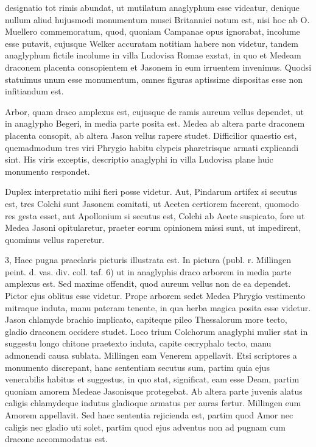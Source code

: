 \documentclass[a4paper, 11pt, oneside, polutonikogreek, german]{article}
\begin{document}
designatio tot rimis abundat, ut mutilatum anaglyphum esse videatur, denique nullum aliud hujusmodi monumentum musei Britannici notum est, nisi hoc ab O. Muellero commemoratum, quod, quoniam Campanae opus ignorabat, incolume esse putavit, cujusque Welker accuratam notitiam habere non videtur, tandem anaglyphum fictile incolume in villa Ludovisa Romae exstat, in quo et Medeam draconem placenta consopientem et Jasonem in eum irruentem invenimus. Quodsi statuimus unum esse monumentum, omnes figuras aptissime dispositas esse non infitiandum est.

Arbor, quam draco amplexus est, cujusque de ramis aureum vellus dependet, ut in anaglypho Begeri, in media parte posita est. Medea ab altera parte draconem placenta consopit, ab altera Jason vellus rapere studet. Difficilior quaestio est, quemadmodum tres viri Phrygio habitu clypeis pharetrisque armati explicandi sint. His viris exceptis, descriptio anaglyphi in villa Ludovisa plane huic monumento respondet.

Duplex interpretatio mihi fieri posse videtur. Aut, Pindarum artifex si secutus est, tres Colchi sunt Jasonem comitati, ut Aeeten certiorem facerent, quomodo res gesta esset, aut Apollonium si secutus est, Colchi ab Aeete suspicato, fore ut Medea Jasoni opitularetur, praeter eorum opinionem missi sunt, ut impedirent, quominus vellus raperetur.

3, Haec pugna praeclaris picturis illustrata est. In pictura (publ. r. Millingen peint. d. vas. div. coll. taf. 6) ut in anaglyphis draco arborem in media parte amplexus est. Sed maxime offendit, quod aureum vellus non de ea dependet. Pictor ejus oblitus esse videtur. Prope arborem sedet Medea Phrygio vestimento mitraque induta, manu pateram tenente, in qua herba magica posita esse videtur. Jason chlamyde brachio implicato, capiteque pileo Thessalorum more tecto, gladio draconem occidere studet. Loco trium Colchorum anaglyphi mulier stat in suggestu longo chitone praetexto induta, capite cecryphalo tecto, manu admonendi causa sublata. Millingen eam Venerem appellavit. Etsi scriptores a monumento discrepant, hanc sententiam secutus sum, partim quia ejus venerabilis habitus et suggestus, in quo stat, significat, eam esse Deam, partim quoniam amorem Medeae Jasonisque protegebat. Ab altera parte juvenis alatus caligis chlamydeque indutus gladioque armatus per auras fertur. Millingen eum Amorem appellavit. Sed haec sententia rejicienda est, partim quod Amor nec caligis nec gladio uti solet, partim quod ejus adventus non ad pugnam cum dracone accommodatus est.
\end{document}
